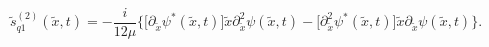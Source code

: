 \begin{equation}
\label{Eq:sq}
\tilde s^{(2)}_{q1}(\tilde x, t)=-\frac{i}{12\mu}
\bigl \{\bigl [  \partial_{\tilde x} \psi^{*}(\tilde x,t) \bigr ]\tilde x
\partial_{\tilde x}^2\psi(\tilde x,t)-
\bigl [ \partial_{\tilde x}^2\psi^{*}(\tilde x,t) \bigr ]\tilde x
\partial_{\tilde x} \psi(\tilde x,t) \bigr \}.
\end{equation}

